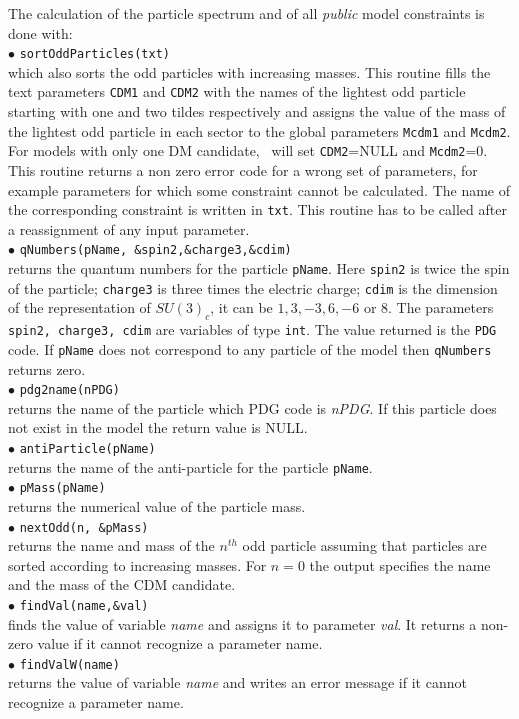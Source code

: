 \documentclass[12pt,a4paper]{article}
\begin{document}
The calculation of the particle spectrum and of all  {\it public} model constraints 
is  done with:\\[2mm]
 $\bullet$ \verb|sortOddParticles(txt)|\\
which also sorts the odd particles with increasing  masses.
This routine  fills the text parameters  \verb|CDM1| and \verb|CDM2| with
the  names of the lightest  odd particle  starting  with one and two tildes respectively and 
assigns  the value of the mass  of
the lightest odd particle in each sector to the global parameters  \verb|Mcdm1| and 
\verb|Mcdm2|.  For models with only one DM candidate, \micro\ will set  \verb|CDM2|=NULL and \verb|Mcdm2|=0. 
This routine returns a non zero error code for a
wrong set of parameters, for example parameters  for which some
constraint cannot be calculated.
The name of the corresponding constraint is
written in \verb|txt|. This routine has to be called after a reassignment of any input parameter.\\[2mm]
% 
%
$\bullet$ \verb|qNumbers(pName, &spin2,&charge3,&cdim)|\\
returns the quantum numbers for the particle \verb|pName|. Here \verb|spin2| is twice the spin of the particle; \verb|charge3| is 
three times the electric charge; \verb|cdim| is the  dimension of the representation
of $SU(3)_c$, it can be $1,3,-3,6,-6$ or $8$. The parameters {\tt spin2, charge3, cdim} are 
variables of type {\tt int}. The value returned 
is the {\tt PDG} code. If \verb|pName| does not correspond to any
particle of the model then \verb|qNumbers| returns zero.\\[2mm]
%
$\bullet$  \verb|pdg2name(nPDG)| \\
returns  the name of  the particle which PDG code is {\it nPDG}. If this particle does not exist in the model
the return value is NULL.\\[2mm]
%
$\bullet$  \verb|antiParticle(pName)| \\
returns  the name of the anti-particle for the particle \verb|pName|.\\[2mm]
%
$\bullet$  \verb|pMass(pName)| \\
returns  the numerical value of the particle mass.\\[2mm]
%
$\bullet$  \verb|nextOdd(n, &pMass)| \\
returns the name and mass of the $n^{th}$ odd particle assuming that particles are 
sorted according to increasing masses. For $n=0$ the output specifies the 
name and the mass of the CDM candidate. \\[2mm]
%
$\bullet$ \verb|findVal(name,&val)|\\
 finds the  value of
 variable  {\it name} and assigns it to parameter {\it val}. It returns a non-zero
value  if it cannot recognize  a parameter name.\\[2mm]
%
$\bullet$ \verb|findValW(name)| \\
returns the value of variable {\it name} and writes an error message
if it cannot recognize  a parameter name.\\[2mm]
\end{document}
